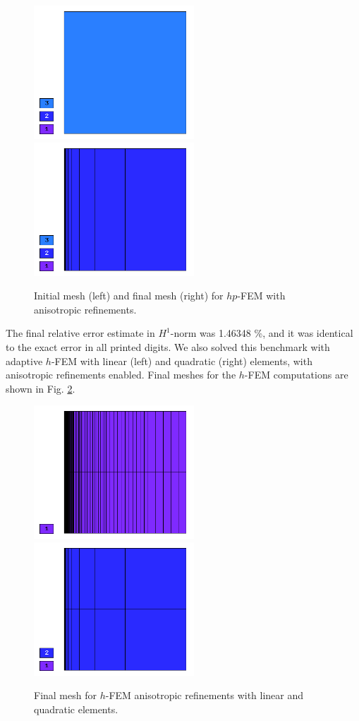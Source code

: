 \begin{figure}[!ht]
\centering
\includegraphics[height=5cm]{nist/nist-7/mesh_hp_aniso_init.png}\ \
\includegraphics[height=5cm]{nist/nist-7/mesh_hp_aniso.png}
\vspace{-2mm}
\caption{Initial mesh (left) and final mesh (right) for $hp$-FEM with anisotropic refinements.}
\label{fig:nist-7-hp-aniso}
\end{figure}

The final relative error estimate in $H^1$-norm was 1.46348 \%,
and it was identical to the exact error in all printed digits.
We also solved this benchmark with adaptive $h$-FEM
with linear (left) and quadratic (right)
elements, with anisotropic refinements enabled.
Final meshes for the $h$-FEM computations are shown
in Fig. \ref{fig:nist-7-h-aniso}.

\begin{figure}[!ht]
\centering
\includegraphics[height=5cm]{nist/nist-7/mesh_h1_aniso.png}\ \
\includegraphics[height=5cm]{nist/nist-7/mesh_h2_aniso.png}
\vspace{-2mm}
\caption{Final mesh for $h$-FEM anisotropic refinements with linear and quadratic elements.}
\label{fig:nist-7-h-aniso}
\end{figure}

